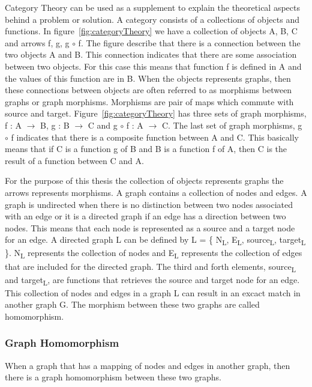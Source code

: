 Category Theory can be used as a supplement to explain the theoretical aspects
behind a problem or solution. A category consists of a collections of
objects and functions. In figure~\ref{fig:categoryTheory} we have a collection
of objects A, B, C and arrows f, g, g $\circ$ f. The figure describe that
there is a connection between the two objects A and B. This connection
indicates that there are some association between two objects. For this case
this means that function f is defined in A and the values of this function are
in B. When the objects represents graphs, then these connections between objects
are often referred to as morphisms between graphs or graph morphisms. Morphisms
are pair of maps which commute with source and target\cite{Brown2008}.
Figure~\ref{fig:categoryTheory} has three sets of graph morphisms, f : A
$\longrightarrow$ B, g : B $\longrightarrow$ C and g $\circ$ f : A
$\longrightarrow$ C. The last set of graph morphisms, g $\circ$ f indicates that
there is a composite function between A and C. This basically means that if
C is a function g of B and B is a function f of A, then C is the result of a
function between C and A. 

For the purpose of this thesis the collection of objects represents graphs the
arrows represents morphisms. A graph contains a collection of nodes and edges.
A graph is undirected when there is no distinction between two nodes associated
with an edge or it is a directed graph if an edge has a direction between two
nodes. This means that each node is represented as a source and a target node
for an edge. A directed graph L can be defined by L = \{
N\textsubscript{L}, E\textsubscript{L}, source\textsubscript{L},
target\textsubscript{L} \}. N\textsubscript{L} represents the collection of
nodes and E\textsubscript{L} represents the collection of edges that are
included for the directed graph. The third and forth elements,
source\textsubscript{L} and target\textsubscript{L}, are functions that
retrieves the source and target node for an edge. This collection of nodes and
edges in a graph L can result in an excact match in another graph G. The
morphism between these two graphs are called homomorphism.

\subsubsection*{Graph Homomorphism}

When a graph that has a mapping of nodes and edges in another graph, then there
is a graph homomorphism between these two graphs.

